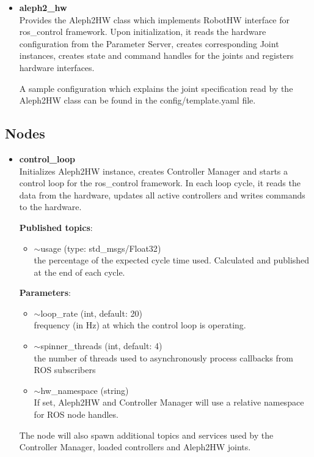 \documentclass[english,inz,shortabstract]{iithesis}
\newcommand{\val}[1]{\textbf{\textsf{#1}}}
\begin{document}
\begin{itemize}
		\item \val{aleph2\_hw}\\
		Provides the \textsf{Aleph2HW} class which implements \textsf{RobotHW} interface for \textsf{ros\_control} framework. Upon initialization, it reads the hardware configuration from the Parameter Server, creates corresponding \textsf{Joint} instances, creates state and command handles for the joints and registers hardware interfaces.

		A sample configuration which explains the joint specification read by the \textsf{Aleph2HW} class can be found in the \textsf{config/template.yaml} file.

	\end{itemize}

\subsection{Nodes}

	\begin{itemize}
		\item \val{control\_loop}\\
		Initializes \textsf{Aleph2HW} instance, creates Controller Manager and starts a control loop for the \textsf{ros\_control} framework. In each loop cycle, it reads the data from the hardware, updates all active controllers and writes commands to the hardware.

		\textbf{Published topics}:
		\begin{itemize}[itemsep=0pt, parsep=2pt, topsep=0pt]
			\item \textsf{$\sim$usage} (type: \textsf{std\_msgs/Float32})\\
			the percentage of the expected cycle time used. Calculated and published at the end of each cycle.
		\end{itemize}

		\textbf{Parameters}:
		\begin{itemize}[itemsep=0pt, parsep=2pt, topsep=0pt]
			\item \textsf{$\sim$loop\_rate} (\textsf{int}, default: \textsf{20})\\
			frequency (in Hz) at which the control loop is operating.
			\item \textsf{$\sim$spinner\_threads} (\textsf{int}, default: \textsf{4})\\
			the number of threads used to asynchronously process callbacks from ROS subscribers
			\item \textsf{$\sim$hw\_namespace} (\textsf{string})\\
			If set, Aleph2HW and Controller Manager will use a relative namespace for ROS node handles.
		\end{itemize}

		The node will also spawn additional topics and services used by the Controller Manager, loaded controllers and \textsf{Aleph2HW} joints.
	\end{itemize}
\end{document}
